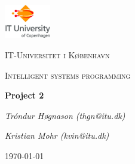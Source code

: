 
\begin{titlepage}
	\centering
	\includegraphics[width=0.15\textwidth]{logo}\par\vspace{1cm}
	{\scshape\LARGE IT-Universitet i København \par}
	\vspace{1cm}
	{\scshape\Large Intelligent systems programming\par}
	\vspace{1.5cm}
	{\huge\bfseries Project 2\par}
	\vspace{2cm}
	{\Large\itshape Tróndur Høgnason (thgn@itu.dk)\par}
	{\Large\itshape Kristian Mohr (kvin@itu.dk)\par}
	\vspace{\fill}
	{\large \today\par}
\end{titlepage}